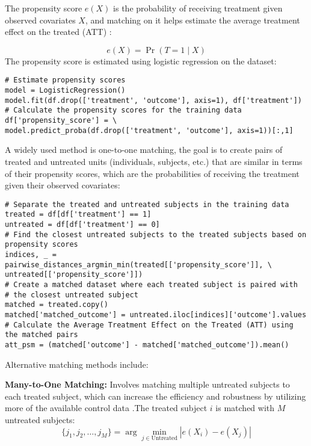 \documentclass{article}
\begin{document}
The propensity score \(e(X)\) is the probability of receiving treatment given observed covariates \(X\), and matching on it helps estimate the average treatment effect on the treated (ATT) \cite{imbens_nonparametric_2004}:

\[
e(X) = \Pr(T = 1 \mid X)
\]
The propensity score is estimated using logistic regression on the dataset:

\begin{verbatim}
# Estimate propensity scores
model = LogisticRegression()
model.fit(df.drop(['treatment', 'outcome'], axis=1), df['treatment'])
# Calculate the propensity scores for the training data
df['propensity_score'] = \
model.predict_proba(df.drop(['treatment', 'outcome'], axis=1))[:,1]
\end{verbatim}

\noindent A widely used method is one-to-one matching, the goal is to create pairs of treated and untreated units (individuals, subjects, etc.) that are similar in terms of their propensity scores, which are the probabilities of receiving the treatment given their observed covariates:

\begin{verbatim}
# Separate the treated and untreated subjects in the training data
treated = df[df['treatment'] == 1]
untreated = df[df['treatment'] == 0]
# Find the closest untreated subjects to the treated subjects based on propensity scores
indices, _ = pairwise_distances_argmin_min(treated[['propensity_score']], \ 
untreated[['propensity_score']])
# Create a matched dataset where each treated subject is paired with 
# the closest untreated subject
matched = treated.copy()
matched['matched_outcome'] = untreated.iloc[indices]['outcome'].values
# Calculate the Average Treatment Effect on the Treated (ATT) using the matched pairs
att_psm = (matched['outcome'] - matched['matched_outcome']).mean()
\end{verbatim}

\noindent Alternative matching methods include:

\textbf{Many-to-One Matching:}
Involves matching multiple untreated subjects to each treated subject, which can increase the efficiency and robustness by utilizing more of the available control data \cite{ming2000substantial}.The treated subject \(i\) is matched with \(M\) untreated subjects:
\[
\{j_1, j_2, \ldots, j_M\} = \arg \min_{j \in \text{Untreated}} |e(X_i) - e(X_j)|
\]
\end{document}
